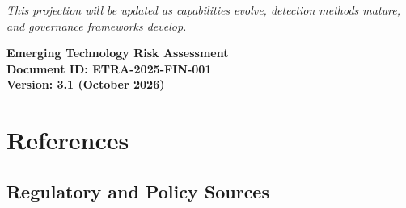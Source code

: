 \documentclass[11pt,letterpaper]{article}
\begin{document}
\vspace{1cm}
\begin{center}
\textit{This projection will be updated as capabilities evolve, detection methods mature, and governance frameworks develop.}

\vspace{0.5cm}
\textbf{Emerging Technology Risk Assessment}\\
\textbf{Document ID: ETRA-2025-FIN-001}\\
\textbf{Version: 3.1 (October 2026)}
\end{center}

\newpage
\section*{References}

\subsection*{Regulatory and Policy Sources}
\end{document}
